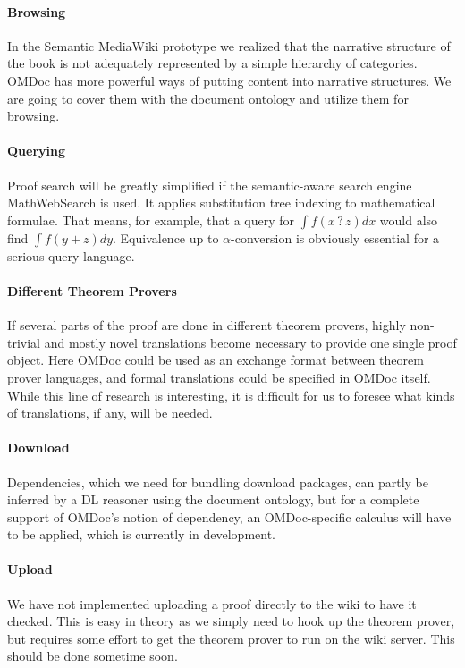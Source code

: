 \paragraph{Browsing} In the Semantic MediaWiki prototype we realized that the
narrative structure of the book is not adequately represented by a simple
hierarchy of categories.  OMDoc has more powerful ways of putting content into
narrative structures\cite{KohMueMue:dfncimk07}.  We are going to cover them with
the document ontology and utilize them for browsing.


\paragraph{Querying} Proof search will be greatly simplified if
the semantic-aware search engine MathWebSearch\cite{KohSuc:asemf06} is
used.  It applies substitution tree indexing to mathematical formulae.
That means, for example, that a query for $\int f(x\mathop{?}z) dx$
would also find $\int f(y+z) dy$.  Equivalence up to
$\alpha$-conversion is obviously essential for a serious query
language.

\paragraph{Different Theorem Provers} If several parts of the proof are done in different
theorem provers, highly non-trivial and mostly novel translations become
necessary to provide one single proof object. Here OMDoc could be used as an
exchange format between theorem prover languages, and formal translations could
be specified in OMDoc itself.  While this line of research is interesting, it is
difficult for us to foresee what kinds of translations, if any, will be needed.

\paragraph{Download}
Dependencies, which we need for bundling download packages, can partly be
inferred by a DL reasoner using the document ontology, but for a complete
support of OMDoc's notion of dependency, an OMDoc-specific calculus will have to
be applied, which is currently in development.

\paragraph{Upload} We have not implemented uploading a proof
directly to the wiki to have it checked.  This is easy in theory
as we simply need to hook up the theorem prover, but requires some
effort to get the theorem prover to run on the wiki server.  This
should be done sometime soon.  



